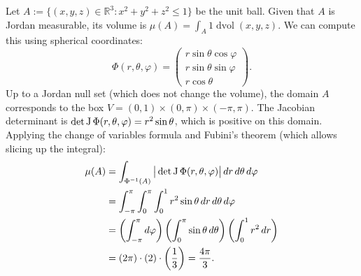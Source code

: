\begin{example}
\label{ex:volume_sphere}
Let $A := \{(x,y,z) \in \mathbb{R}^3 : x^2+y^2+z^2 \leq 1\}$ be the unit ball. Given that $A$ is Jordan measurable, its volume is $\mu(A) = \int_A 1 \mathop{d\text{vol}}(x,y,z)$.
We can compute this using spherical coordinates:
\[\Phi(r,\theta,\varphi) = \begin{pmatrix} r\sin\theta\cos\varphi \\ r\sin\theta\sin\varphi \\ r\cos\theta \end{pmatrix}.\]
Up to a Jordan null set (which does not change the volume), the domain $A$ corresponds to the box $V = (0,1) \times (0,\pi) \times (-\pi,\pi)$.
The Jacobian determinant is $\det\operatorname{J}\Phi(r,\theta,\varphi) = r^2\sin\theta$, which is positive on this domain.
Applying the change of variables formula and Fubini's theorem (which allows slicing up the integral):
\begin{align*}
\mu(A) &= \int_{\Phi^{-1}(A)} \big|\det\operatorname{J}\Phi(r,\theta,\varphi)\big| \,dr\,d\theta\,d\varphi \\
&= \int_{-\pi}^\pi \int_0^\pi \int_0^1 r^2\sin\theta \,dr\,d\theta\,d\varphi \\
&= \left(\int_{-\pi}^\pi d\varphi\right) \left(\int_0^\pi \sin\theta \,d\theta\right) \left(\int_0^1 r^2 \,dr\right) \\
&= (2\pi) \cdot (2) \cdot \left(\frac{1}{3}\right) = \frac{4\pi}{3}.
\end{align*}
\end{example}

